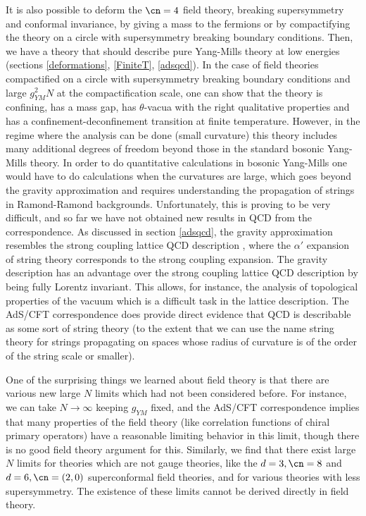 It is also possible to deform the $\cn=4$ field theory,
breaking supersymmetry and conformal invariance, by giving  a mass
to the fermions or by compactifying the theory on a circle with
supersymmetry breaking boundary conditions.
Then, we have a theory that should describe pure
 Yang-Mills theory at low energies (sections \ref{deformations},
\ref{FiniteT}, \ref{adsqcd}). 
In the case of field theories compactified on a circle with
supersymmetry breaking boundary conditions and  
 large $g_{YM}^2 N$ at the compactification scale,
one can show that the theory is confining, has a 
mass gap, has $\theta$-vacua with the right qualitative properties and
has a confinement-deconfinement transition at finite temperature.
However, in the regime where the analysis
can be done (small curvature) this theory includes many
additional degrees of freedom beyond those in the standard bosonic
Yang-Mills theory.
In order to do quantitative calculations in bosonic Yang-Mills
one would have to do calculations when 
the curvatures are large, which goes beyond the gravity approximation
and requires understanding the propagation of strings in Ramond-Ramond
backgrounds. Unfortunately, this is proving to be very difficult, and
so far we have not obtained new results in QCD from the correspondence.
As discussed in section \ref{adsqcd}, the gravity approximation
resembles the strong coupling lattice QCD description 
\cite{Wilson:1974co},
where the $\alpha'$ expansion of string theory corresponds to the strong
coupling expansion.
The gravity description has an advantage over the  strong  
coupling lattice QCD description
by being fully Lorentz invariant. This allows, for instance, 
the analysis of topological  
properties 
of the vacuum which is a difficult task in the lattice description.
The AdS/CFT correspondence does provide direct
evidence that QCD is describable as some sort of string theory (to the
extent that we can use the name string theory for strings propagating
on spaces whose radius of curvature is of the order of  the string scale
or smaller).

One of the surprising things we learned about field theory is that 
there are various new large $N$ limits which had not been considered
before. For instance, 
we can take $N\to \infty$ keeping $g_{YM}$ fixed, and the AdS/CFT
correspondence implies that many properties of the field theory (like
correlation functions of chiral primary operators) have a
reasonable limiting behavior in this limit, though there is no good
field theory argument for this. Similarly, we find that there exist
large $N$ limits for theories which are not gauge theories, like the 
$d=3,\cn=8$ and $d=6,\cn=(2,0)$ superconformal field theories, and for
various theories with less supersymmetry. The existence of these
limits cannot be
derived directly in field theory.

